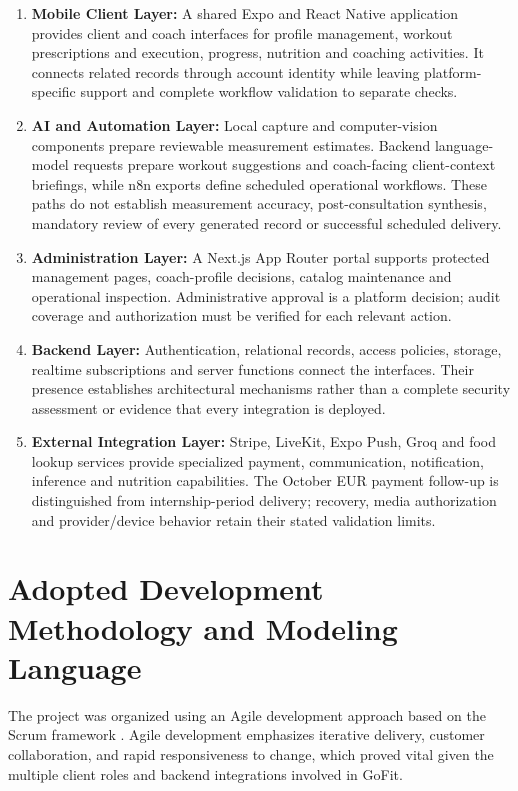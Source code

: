 \documentclass[12pt,a4paper,openany]{report}
\begin{document}
\begin{enumerate}
    \item \textbf{Mobile Client Layer:} A shared Expo and React Native application provides client and coach interfaces for profile management, workout prescriptions and execution, progress, nutrition and coaching activities. It connects related records through account identity while leaving platform-specific support and complete workflow validation to separate checks.
    \item \textbf{AI and Automation Layer:} Local capture and computer-vision components prepare reviewable measurement estimates. Backend language-model requests prepare workout suggestions and coach-facing client-context briefings, while n8n exports define scheduled operational workflows. These paths do not establish measurement accuracy, post-consultation synthesis, mandatory review of every generated record or successful scheduled delivery.
    \item \textbf{Administration Layer:} A Next.js App Router portal supports protected management pages, coach-profile decisions, catalog maintenance and operational inspection. Administrative approval is a platform decision; audit coverage and authorization must be verified for each relevant action.
    \item \textbf{Backend Layer:} Authentication, relational records, access policies, storage, realtime subscriptions and server functions connect the interfaces. Their presence establishes architectural mechanisms rather than a complete security assessment or evidence that every integration is deployed.
    \item \textbf{External Integration Layer:} Stripe, LiveKit, Expo Push, Groq and food lookup services provide specialized payment, communication, notification, inference and nutrition capabilities. The October EUR payment follow-up is distinguished from internship-period delivery; recovery, media authorization and provider/device behavior retain their stated validation limits.
\end{enumerate}

\section{Adopted Development Methodology and Modeling Language}

The project was organized using an Agile development approach based on the Scrum framework \cite{beck2001manifesto, scrumguide2020}. Agile development emphasizes iterative delivery, customer collaboration, and rapid responsiveness to change, which proved vital given the multiple client roles and backend integrations involved in GoFit.
\end{document}
